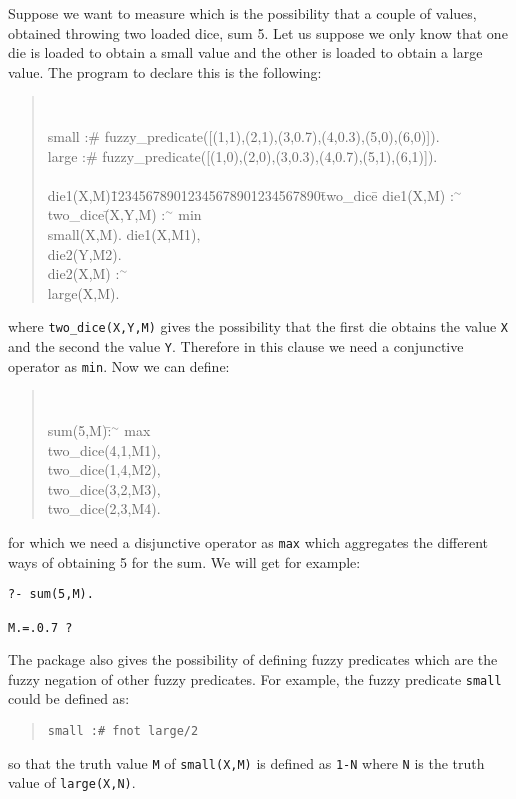 Suppose we want to measure which is the possibility that a couple
of values, obtained throwing two loaded dice, sum 5. Let us suppose we
only know that one die is loaded to obtain a small value and the other
is loaded to obtain a large value. The program to declare this is the
following: 
\begin{quote}
{\tt
\begin{tabbing} 
small :\# fuzzy\_predicate([(1,1),(2,1),(3,0.7),(4,0.3),(5,0),(6,0)]). \\
large :\# fuzzy\_predicate([(1,0),(2,0),(3,0.3),(4,0.7),(5,1),(6,1)]). \\
\ \\
die1(X,M)\= 123456789012345678901234567890\= two\_dice\=\kill
die1(X,M)\> :{\tiny$^\sim$}       \> two\_dice\=(X,Y,M) :{\tiny$^\sim$} min \\
\>       small(X,M).            \> \> die1(X,M1), \\
\>                              \> \> die2(Y,M2). \\
die2(X,M) :{\tiny$^\sim$} \\
\>        large(X,M).
\end{tabbing}
}
\end{quote}
%
where \texttt{two\_dice(X,Y,M)} gives the possibility that the first die
obtains the value \texttt{X} and the second the value \texttt{Y}.
Therefore in this clause we need a conjunctive operator as
\texttt{min}. Now we can define:
\begin{quote}
{\tt
\begin{tabbing} 
sum(5,M)\= :{\tiny$^\sim$} max \\
\>        two\_dice(4,1,M1), \\
\>        two\_dice(1,4,M2), \\
\>        two\_dice(3,2,M3), \\
\>        two\_dice(2,3,M4).
\end{tabbing}
}
\end{quote}
%
for which we need a disjunctive operator as \texttt{max} which
aggregates the different ways of obtaining 5 for the sum. We will
get for example: 

\begin{verbatim}
?- sum(5,M).

M.=.0.7 ?
\end{verbatim}

The package also gives the possibility of defining fuzzy predicates
which are the fuzzy negation of other fuzzy predicates. For example,
the fuzzy predicate \texttt{small} could be defined as:
\begin{quote}
\begin{verbatim}
small :# fnot large/2
\end{verbatim}
\end{quote}
%
so that the truth value \verb+M+ of \verb+small(X,M)+ is defined as
\verb+1-N+ where \verb+N+ is the truth value of \verb+large(X,N)+.  

